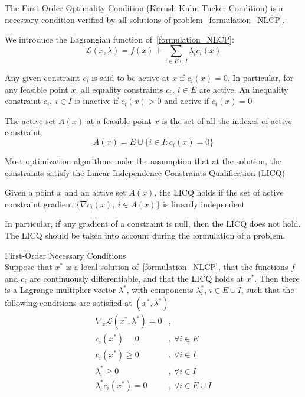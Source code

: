 The First Order Optimality Condition (Karush-Kuhn-Tucker Condition) is a necessary condition verified by all solutions of problem~\ref{formulation_NLCP}.

We introduce the Lagrangian function of~\ref{formulation_NLCP}:
\begin{equation}
  \mathcal{L}(x,\lambda) = f(x) + \sum_{i\in E\cup I}\lambda_i c_i(x)
\end{equation}

Any given constraint $c_i$ is said to be active at $x$ if $c_i(x)=0$.
In particular, for any feasible point $x$, all equality constraints $c_i,\ i\in E$ are active.
An inequality constraint $c_i,\ i\in I$ is inactive if $c_i(x)>0$ and active if $c_i(x) = 0$

\begin{definition}
\label{active_set}
  The active set $\mathit{A}(x)$ at a feasible point $x$ is the set of all the indexes of active constraint.
  \begin{equation}
    \mathit{A}(x)=E\cup\{i\in I: c_i(x) = 0\}
  \end{equation}
\end{definition}

Most optimization algorithms make the assumption that at the solution, the constraints satisfy the Linear Independence Constraints Qualification (LICQ)

\begin{definition}
  Given a point $x$ and an active set $\mathit{A}(x)$, the LICQ holds if the set of active constraint gradient $\{\nabla c_i(x),\ i\in \mathit{A}(x)\}$ is linearly independent
\end{definition}

In particular, if any gradient of a constraint is null, then the LICQ does not hold.
The LICQ should be taken into account during the formulation of a problem.

\begin{theorem}{First-Order Necessary Conditions}\\
\label{KKT_conditions}
  Suppose that $x^*$ is a local solution of~\ref{formulation_NLCP}, that the functions $f$ and $c_i$ are continuously differentiable, and that the LICQ holds at $x^*$.
  Then there is a Lagrange multiplier vector $\lambda^*$, with components $\lambda_i^*$, $i\in E\cup I$, such that the following conditions are satisfied at $(x^*,\lambda^*)$
  \begin{equation}
  \begin{array}{ll}
    \nabla_x\mathcal{L}(x^*,\lambda^*) = 0 &, \\
    c_i(x^*) = 0 &,\ \forall i\in E\\
    c_i(x^*) \geq 0 &,\ \forall i\in I\\
    \lambda_i^* \geq 0 &,\ \forall i\in I\\
    \lambda_i^* c_i(x^*)=0 &,\ \forall i \in E\cup I\\
  \end{array}
  \end{equation}
\end{theorem}

